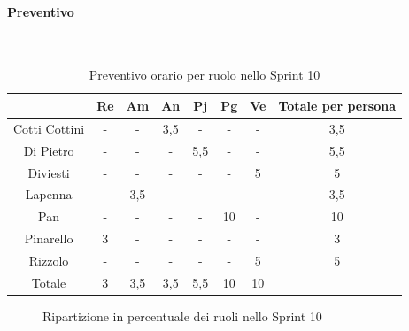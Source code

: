 \documentclass{article}
\begin{document}
                \paragraph{Preventivo}\mbox{}\\
                \begin{table}[H]
                    \centering
                    \begin{tabular}{|c|c|c|c|c|c|c|c|}
                    \hline
                                  & Re  & Am  & An  & Pj  & Pg  & Ve  & Totale per persona \\ \hline
                    Cotti Cottini & -   & -   & 3,5 & -   & -   & -   & 3,5                \\ \hline
                    Di Pietro     & -   & -   & -   & 5,5 & -   & -   & 5,5                \\ \hline
                    Diviesti      & -   & -   & -   & -   & -   & 5   & 5                  \\ \hline
                    Lapenna       & -   & 3,5 & -   & -   & -   & -   & 3,5                \\ \hline
                    Pan           & -   & -   & -   & -   & 10  & -   & 10                 \\ \hline
                    Pinarello     & 3   & -   & -   & -   & -   & -   & 3                  \\ \hline
                    Rizzolo       & -   & -   & -   & -   & -   & 5   & 5                  \\ \hline
                    Totale        & 3   & 3,5 & 3,5 & 5,5 & 10  & 10  &                    \\ \hline
                    \end{tabular}
                    \caption{Preventivo orario per ruolo nello Sprint 10}
                \end{table}


                \begin{figure}[H]
                    \centering
                    \caption{Ripartizione in percentuale dei ruoli nello Sprint 10}
                \end{figure}


\end{document}
